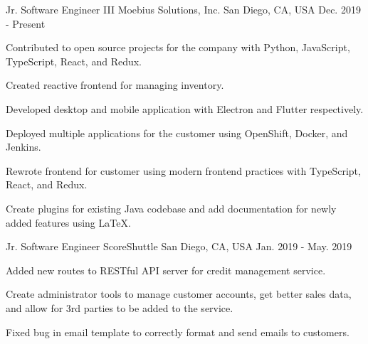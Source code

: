 

\begin{cventries}

	\cventry
	{Jr. Software Engineer III} %
	{Moebius Solutions, Inc.} %
	{San Diego, CA, USA} %
	{Dec. 2019 - Present} %
	{
		\begin{cvitems} %
			\item {Contributed to open source projects for the company with Python, JavaScript, TypeScript, React, and Redux.}
			\item {Created reactive frontend for managing inventory.}
			\item {Developed desktop and mobile application with Electron and Flutter respectively.}
			\item {Deployed multiple applications for the customer using OpenShift, Docker, and Jenkins.}
			\item {Rewrote frontend for customer using modern frontend practices with TypeScript, React, and Redux.}
			\item {Create plugins for existing Java codebase and add documentation for newly added features using LaTeX.}
		\end{cvitems}
	}

	\cventry
	{Jr. Software Engineer} %
	{ScoreShuttle} %
	{San Diego, CA, USA} %
	{Jan. 2019 - May. 2019} %
	{
		\begin{cvitems} %
			\item {Added new routes to RESTful API server for credit management service.}
			\item {Create administrator tools to manage customer accounts, get better sales data, and allow for 3rd parties to be added to the service.}
			\item {Fixed bug in email template to correctly format and send emails to customers.}
		\end{cvitems}
	}

\end{cventries}

